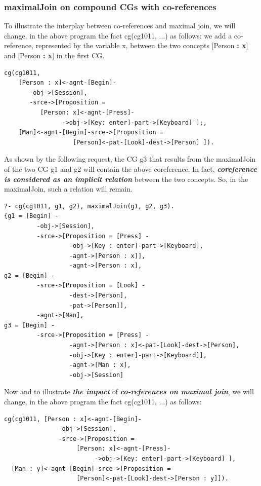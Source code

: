 \documentclass{book}
\begin{document}
\subsubsection{maximalJoin on compound CGs with co-references}

To illustrate the interplay between co-references and maximal join,
we will change, in the above program the fact cg(cg1011, ...)  as
follows: we add a co-reference, represented by the variable x, between
the two concepts [Person {\bf : x}] and [Person {\bf :
x}] in the first CG.


\begin{verbatim}
cg(cg1011,
    [Person : x]<-agnt-[Begin]-
       -obj->[Session],
       -srce->[Proposition =
          [Person: x]<-agnt-[Press]-
                ->obj->[Key: enter]-part->[Keyboard] ];,
    [Man]<-agnt-[Begin]-srce->[Proposition =
                   [Person]<-pat-[Look]-dest->[Person] ]).
\end{verbatim}


As shown by the following request, the CG g3 that results from
the maximalJoin of the two CG g1 and g2 will contain the above
coreference. In fact, {\it {\bf coreference is considered as an
implicit relation}} between the two concepts. So, in
the maximalJoin, such a relation will remain.


\begin{verbatim}
?- cg(cg1011, g1, g2), maximalJoin(g1, g2, g3).
{g1 = [Begin] -
         -obj->[Session],
         -srce->[Proposition = [Press] -
                  -obj->[Key : enter]-part->[Keyboard],
                  -agnt->[Person : x]],
                  -agnt->[Person : x],
g2 = [Begin] -
         -srce->[Proposition = [Look] -
                  -dest->[Person],
                  -pat->[Person]],
         -agnt->[Man],
g3 = [Begin] -
         -srce->[Proposition = [Press] -
                  -agnt->[Person : x]<-pat-[Look]-dest->[Person],
                  -obj->[Key : enter]-part->[Keyboard]],
                  -agnt->[Man : x],
                  -obj->[Session]
\end{verbatim}




Now and to illustrate {\bf {\it the impact}} of {\bf {\it
co-references on maximal join}}, we will change, in the above program
the fact cg(cg1011, ...) as follows:


\begin{verbatim}
cg(cg1011, [Person : x]<-agnt-[Begin]-
               -obj->[Session],
               -srce->[Proposition =
                    [Person: x]<-agnt-[Press]-
                         ->obj->[Key: enter]-part->[Keyboard] ],
  [Man : y]<-agnt-[Begin]-srce->[Proposition =
                    [Person]<-pat-[Look]-dest->[Person : y]]).
\end{verbatim}
\end{document}
